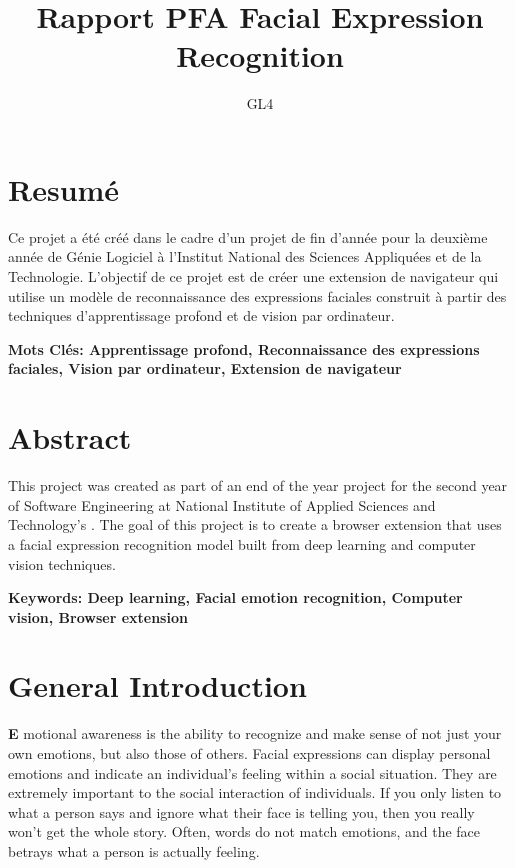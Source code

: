 \documentclass[12pt,a4paper,oneside,english]{book}
\author{GL4}
\title{Rapport PFA Facial Expression Recognition}
\begin{document}

\dominitoc
{}
\frontmatter
{}
\chapter*{\textbf{Resumé}}
\normalsize{Ce projet a été créé dans le cadre d'un projet de fin d'année pour la deuxième année de Génie Logiciel à l'Institut National des Sciences Appliquées et de la Technologie. L'objectif de ce projet est de créer une extension de navigateur qui utilise un modèle de reconnaissance des expressions faciales construit à partir des techniques d'apprentissage profond et de vision par ordinateur.}

\medskip
{\noindent \textbf{Mots Clés: Apprentissage profond, Reconnaissance des expressions faciales, Vision par ordinateur, Extension de navigateur} }

{\let\clearpage\relax\chapter*{\textbf{Abstract}}}
\normalsize{This project was created as part of an end of the year project for the second year of Software Engineering at National Institute of Applied Sciences and Technology’s . The goal of this project is to create a browser extension that uses a facial expression recognition model built from deep learning and computer vision techniques.}

\medskip
{\noindent \textbf{Keywords: Deep learning, Facial emotion recognition, Computer vision, Browser extension} }


\tableofcontents
\newpage 
\listoffigures \mtcaddchapter 
\newpage 
\listoftables 
\newpage
{}

\mainmatter
\chapter*{\textbf{General Introduction}}

\lettrine[findent=2pt]{\textbf{E}}{ }motional awareness is the ability to recognize and make sense of not just your own emotions, but also those of others. Facial expressions can display personal emotions and indicate an individual’s feeling within a social situation.
They are extremely important to the social interaction of individuals. If you only listen to what a person says and ignore what their face is telling you, then you really won't get the whole story. Often, words do not match emotions, and the face betrays what a person is actually feeling.
\end{document}
